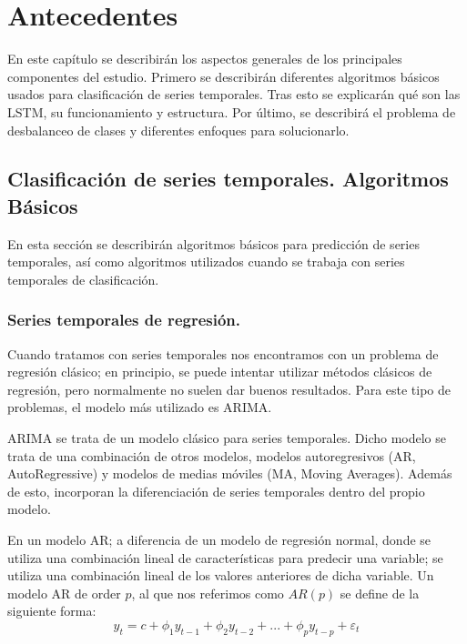 \chapter{Antecedentes}
En este capítulo se describirán los aspectos generales de los principales componentes del estudio. Primero se describirán diferentes algoritmos básicos usados para clasificación de series temporales. Tras esto se explicarán qué son las LSTM, su funcionamiento y estructura. Por último, se describirá el problema de desbalanceo de clases y diferentes enfoques para solucionarlo.\newline

\section{Clasificación de series temporales. Algoritmos Básicos}
En esta sección se describirán algoritmos básicos para predicción de series temporales, así como algoritmos utilizados cuando se trabaja con series temporales de clasificación.\newline

\subsection{Series temporales de regresión.}
Cuando tratamos con series temporales nos encontramos con un problema de regresión clásico; en principio, se puede intentar utilizar métodos clásicos de regresión, pero normalmente no suelen dar buenos resultados. Para este tipo de problemas, el modelo más utilizado es ARIMA.\newline

ARIMA se trata de un modelo clásico para series temporales. Dicho modelo se trata de una combinación de otros modelos, modelos autoregresivos (AR, AutoRegressive) y modelos de medias móviles (MA, Moving Averages). Además de esto, incorporan la diferenciación de series temporales dentro del propio modelo.\newline

En un modelo AR; a diferencia de un modelo de regresión normal, donde se utiliza una combinación lineal de características para predecir una variable; se utiliza una combinación lineal de los valores anteriores de dicha variable. Un modelo AR de order $p$, al que nos referimos como $AR(p)$ se define de la siguiente forma:\newline
$$ y_t = c + \phi_1 y_{t-1} + \phi_2 y_{t-2} + ... + \phi_p y_{t-p} + \varepsilon_t $$

